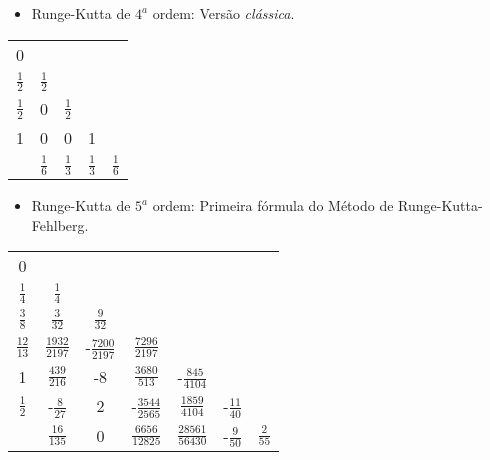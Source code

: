 \documentclass[final,5p]{elsarticle}
\numberwithin{equation}{section}
\begin{document}
    \begin{itemize}
        \item Runge-Kutta de $4^a$ ordem: Versão \emph{clássica}.
    \end{itemize}
    \hspace{2em}
    \renewcommand{\arraystretch}{1.2}
    \begin{tabular}{c|cccc}
        0             &               &               &               & \\
        $\frac{1}{2}$ & $\frac{1}{2}$ &               &               & \\
        $\frac{1}{2}$ & 0             & $\frac{1}{2}$ &               & \\
        1             & 0             & 0             & 1             & \\
        \hline
                      & $\frac{1}{6}$ & $\frac{1}{3}$ & $\frac{1}{3}$ & $\frac{1}{6}$ \\
    \end{tabular}
    \bigskip

    \begin{itemize}
        \item Runge-Kutta de $5^a$ ordem: Primeira fórmula do Método de Runge-Kutta-Fehlberg.
    \end{itemize}
    \hspace{2em}
    \renewcommand{\arraystretch}{1.2}
    \begin{tabular}{c|cccccc}
        0               &                     &                      &                      &                     &                   &  \\
        $\frac{1}{4}$   & $\frac{1}{4}$       &                      &                      &                     &                   &  \\
        $\frac{3}{8}$   & $\frac{3}{32}$      & $\frac{9}{32}$       &                      &                     &                   &  \\
        $\frac{12}{13}$ & $\frac{1932}{2197}$ & -$\frac{7200}{2197}$ & $\frac{7296}{2197}$  &                     &                   &  \\
        1               & $\frac{439}{216}$   & -8                   & $\frac{3680}{513}$   & -$\frac{845}{4104}$ &                   &  \\
        $\frac{1}{2}$   & -$\frac{8}{27}$     & 2                    & -$\frac{3544}{2565}$ & $\frac{1859}{4104}$ & -$\frac{11}{40}$  &  \\
        \hline
                        & $\frac{16}{135}$    & 0                    & $\frac{6656}{12825}$ & $\frac{28561}{56430}$ & -$\frac{9}{50}$ & $\frac{2}{55}$ \\
    \end{tabular}
    \bigskip
\end{document}
